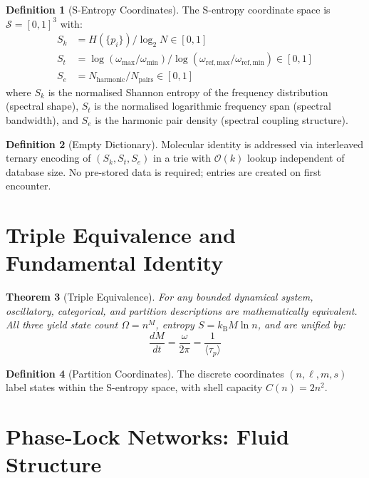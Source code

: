 \documentclass[twocolumn,10pt,a4paper]{article}
\theoremstyle{plain}
\newtheorem{theorem}{Theorem}[section]
\theoremstyle{definition}
\newtheorem{definition}[theorem]{Definition}
\theoremstyle{remark}
\newcommand{\kB}{k_{\mathrm{B}}}
\newcommand{\Sspace}{\mathcal{S}}
\newcommand{\Sk}{S_k}
\newcommand{\St}{S_t}
\newcommand{\Se}{S_e}
\newcommand{\taup}{\tau_p}
\newcommand{\BigO}{\mathcal{O}}
\begin{document}
\begin{definition}[S-Entropy Coordinates]
\label{def:s_coords}
The S-entropy coordinate space is $\Sspace = [0,1]^3$ with:
\begin{align}
    \Sk &= H(\{p_i\}) / \log_2 N \in [0,1] \\
    \St &= \log(\omega_{\max}/\omega_{\min}) / \log(\omega_{\mathrm{ref,max}}/\omega_{\mathrm{ref,min}}) \in [0,1] \\
    \Se &= N_{\mathrm{harmonic}} / N_{\mathrm{pairs}} \in [0,1]
\end{align}
where $\Sk$ is the normalised Shannon entropy of the frequency distribution (spectral shape), $\St$ is the normalised logarithmic frequency span (spectral bandwidth), and $\Se$ is the harmonic pair density (spectral coupling structure).
\end{definition}

\begin{definition}[Empty Dictionary]
\label{def:empty_dict}
Molecular identity is addressed via interleaved ternary encoding of $(\Sk, \St, \Se)$ in a trie with $\BigO(k)$ lookup independent of database size. No pre-stored data is required; entries are created on first encounter.
\end{definition}

\section{Triple Equivalence and Fundamental Identity}
\label{sec:triple}

\begin{theorem}[Triple Equivalence]
\label{thm:triple}
For any bounded dynamical system, oscillatory, categorical, and partition descriptions are mathematically equivalent. All three yield state count $\Omega = n^M$, entropy $S = \kB M \ln n$, and are unified by:
\begin{equation}
\label{eq:fundamental}
    \frac{dM}{dt} = \frac{\omega}{2\pi} = \frac{1}{\langle\taup\rangle}
\end{equation}
\end{theorem}

\begin{definition}[Partition Coordinates]
The discrete coordinates $(n, \ell, m, s)$ label states within the S-entropy space, with shell capacity $C(n) = 2n^2$.
\end{definition}

\section{Phase-Lock Networks: Fluid Structure}
\label{sec:phase_lock}
\end{document}
